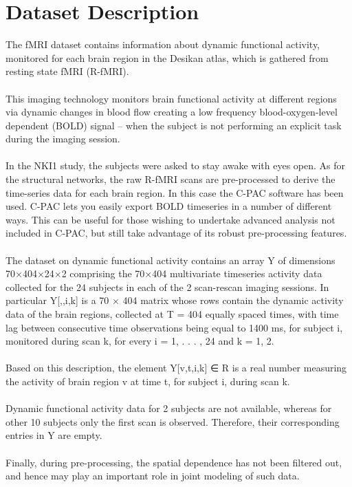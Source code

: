 \documentclass{article}
\begin{document}
\section{Dataset Description}
The fMRI dataset contains information about dynamic functional activity, monitored for each brain region in the Desikan atlas, which is gathered from resting state fMRI (R-fMRI).\\\\
This imaging technology monitors brain functional activity at different regions via dynamic changes in blood flow creating a low frequency blood-oxygen-level dependent (BOLD) signal – when the subject is not performing an explicit task during the imaging session.\\\\
In the NKI1 study, the subjects were asked to stay awake with eyes open.
As for the structural networks, the raw R-fMRI scans are pre-processed to derive the time-series data for each brain region. In this case the C-PAC software has been used. C-PAC lets you easily export BOLD timeseries in a number of different ways. This can be useful for those wishing to undertake advanced analysis not included in C-PAC, but still take advantage of its robust pre-processing features.\\\\
The dataset on dynamic functional activity contains an array Y of dimensions 70×404×24×2 comprising the 70×404 multivariate timeseries activity data collected for the 24 subjects in each of the 2 scan-rescan imaging sessions. In particular Y[,,i,k] is a 70 × 404 matrix whose rows contain the dynamic activity data of the brain regions, collected at T = 404 equally spaced times, with time lag between consecutive time observations being equal to 1400 ms, for subject i, monitored during scan k, for every i = 1, . . . , 24 and k = 1, 2.\\\\
Based on this description, the element Y[v,t,i,k] ∈ R is a real number
measuring the activity of brain region v at time t, for subject i, during scan k.\\\\
Dynamic functional activity data for 2 subjects are not available, whereas for other 10 subjects only the first scan is observed. Therefore, their corresponding entries in Y are empty.\\\\
Finally, during pre-processing, the spatial dependence has not been filtered out, and hence may play an important role in joint modeling of such data.\\\\
\end{document}
